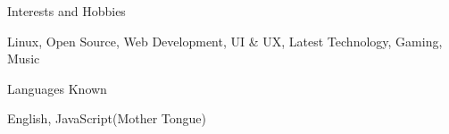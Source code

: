 \documentclass{resume}
\begin{document}
    \begin{rSection}{Interests and Hobbies}
    
        Linux, Open Source, Web Development, UI \& UX, Latest Technology, Gaming,  Music
    
    \end{rSection}
    
    \begin{rSection}{Languages Known}
    
        English, JavaScript(Mother Tongue)
        
    \end{rSection}
\end{document}
